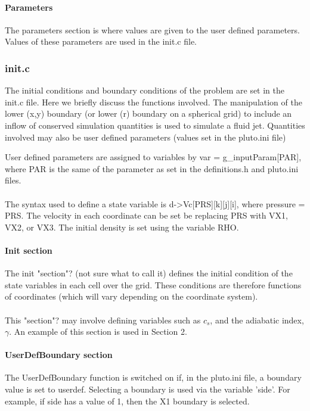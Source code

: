 \documentclass[12pt,a4paper]{report}
\begin{document}
\paragraph{Parameters}\mbox{}
\newline
The parameters section is where values are given to the user defined parameters. Values of these parameters are used in the init.c file.

\subsubsection{init.c}
The initial conditions and boundary conditions of the problem are set in the init.c file. Here we briefly discuss the functions involved. The manipulation of the lower (x,y) boundary (or lower (r) boundary on a spherical grid) to include an inflow of conserved simulation quantities is used to simulate a fluid jet. Quantities involved may also be user defined parameters (values set in the pluto.ini file)

User defined parameters are assigned to variables by var = g\_inputParam[PAR], where PAR is the same of the parameter as set in the definitions.h and pluto.ini files.\\
\\
The syntax used to define a state variable is d->Vc[PRS][k][j][i], where pressure = PRS. The velocity in each coordinate can be set be replacing PRS with VX1, VX2, or VX3. The initial density is set using the variable RHO.

\paragraph{Init section}
The init "section"? (not sure what to call it) defines the initial condition of the state variables in each cell over the grid. These conditions are therefore functions of coordinates (which will vary depending on the coordinate system).\\
\\
This "section"? may involve defining variables such as $c_s$, and the adiabatic index, $\gamma$. An example of this section is used in Section 2.\\

\paragraph{UserDefBoundary section}
The UserDefBoundary function is switched on if, in the pluto.ini file, a boundary value is set to userdef. Selecting a boundary is used via the variable 'side'. For example, if side has a value of 1, then the X1 boundary is selected. 
\end{document}
